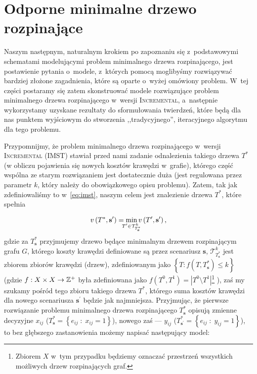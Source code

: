 \section{Odporne minimalne drzewo rozpinające}




Naszym następnym, naturalnym krokiem po zapoznaniu się z~podstawowymi schematami modelującymi problem minimalnego drzewa rozpinającego, jest postawienie pytania o~modele, z~których pomocą moglibyśmy rozwiązywać bardziej złożone zagadnienia, które są oparte o~wyżej omówiony problem.
W~tej części postaramy się zatem skonstruować modele rozwiązujące problem minimalnego drzewa rozpinającego w~wersji \textsc{Incremental}, a~następnie wykorzystamy uzyskane rezultaty do sformułowania twierdzeń, które będą dla nas punktem wyjściowym do stworzenia ,,tradycyjnego'', iteracyjnego algorytmu dla tego problemu.

Przypomnijmy, że problem minimalnego drzewa rozpinającego w~wersji \textsc{Incremental} (\textsc{IMST}) stawiał przed nami zadanie odnalezienia takiego drzewa $T^{\ast}$ (w obliczu pojawienia się nowych kosztów krawędzi w~grafie), którego część wspólna ze starym rozwiązaniem jest dostatecznie duża (jest regulowana przez parametr $k$, który należy do obowiązkowego opisu problemu).
Zatem, tak jak zdefiniowaliśmy to w~\ref{eq:imst}, naszym celem jest znalezienie drzewa $T^{\ast}$, które spełnia

\begin{equation}
	v \left( T^{\ast}, \textbf{s}^{\prime} \right) = \min_{\mathclap{T^{\prime} \in \mathcal{T}^{k}_{T^{\ast}_{\textbf{s}}}}} v \left( T^{\prime}, \textbf{s}^{\prime} \right)\text{,}
\end{equation}
gdzie za $T^{\ast}_{\textbf{s}}$ przyjmujemy drzewo będące minimalnym drzewem rozpinającym grafu $G$, którego koszty krawędzi definiowane są przez scenariusz $\textbf{s}$, $\mathcal{T}^{k}_{T^{\ast}_{\textbf{s}}}$ jest zbiorem zbiorów krawędzi (drzew), zdefiniowanym jako $\left\{ T : f \left( T, T^{\ast}_{\textbf{s}} \right) \leqslant k \right\}$ (gdzie $f: X \times X \rightarrow \mathbb{Z}^{+}$ była zdefiniowana jako $f \left( T^{0}, T^{1} \right) = \left| T^{0} \setminus T^{1} \right|$\footnote{
	Zbiorem $X$ w~tym przypadku będziemy oznaczać przestrzeń wszystkich możliwych drzew rozpinających graf.}
), zaś my szukamy pośród tego zbioru takiego drzewa $T^{\ast}$, którego suma kosztów krawędzi dla nowego scenariusza $\textbf{s}^{\prime}$ będzie jak najmniejsza.
Przyjmując, że pierwsze rozwiązanie problemu minimalnego drzewa rozpinającego $T^{\ast}_{\textbf{s}}$ opisują zmienne decyzyjne $x_{ij}$ ($T^{\ast}_{\textbf{s}} = \left\{ e_{ij} \; : \; x_{ij} = 1 \right\}$), nowego zaś --- $y_{ij}$ ($T^{\ast}_{\textbf{s}^{\prime}} = \left\{ e_{ij} \; : \; y_{ij} = 1 \right\}$), to bez głębszego zastanowienia możemy napisać następujący model:

